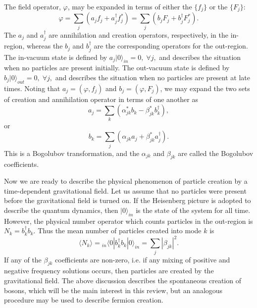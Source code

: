 \documentclass[12pt,onecolumn,eqsecnum,floats,aps,prd,floatfix,titlepage,tightenlines]{revtex4-2}
\begin{document}
The field operator, $\varphi$, may be expanded in terms of either the
$\{ f_j \}$ or the $\{ F_j \}$:
\begin{equation}
  \varphi = \sum\limits_j (a_j f_j + a_j^\dagger f_j^*)
  =\sum\limits_j (b_j F_j + b_j^\dagger F_j^*).
\end{equation}
The $a_j$ and $a_j^\dagger$ are annihilation and creation operators,
respectively, in the in-region, whereas the $b_j$ and $b_j^\dagger$
are the corresponding operators for the out-region. The in-vacuum state
is defined by $a_j|0\rangle_{in}=0, \; \forall j,$ and describes the
situation when no particles are present initially. The out-vacuum state
is defined by $b_j|0\rangle_{out}=0, \; \forall j,$ and describes the
situation when no particles are present at late times. Noting that
$a_j = (\varphi,f_j)$ and $b_j = (\varphi,F_j)$, we may expand the
two sets of creation and annihilation operator in terms of one another
as 
\begin{equation}
a_j=\sum\limits_k (\alpha _{jk}^*b_k-\beta _{jk}^* b_k^\dagger),
                                      \label{eq:Bogo1}
\end{equation}
or 
\begin{equation}
b_k=\sum\limits_j (\alpha _{jk} a_j + \beta _{jk}^* a _j^\dagger).
                                       \label{eq:Bogo2}
\end{equation}
This is a Bogolubov transformation, and the $\alpha_{jk}$ and
$\beta_{jk}$ are called the Bogolubov coefficients.

   Now we are ready to describe the physical phenomenon of particle
creation by a time-dependent gravitational field. Let us assume that
no particles were present before the gravitational field is turned on.
If the Heisenberg picture is adopted to describe the quantum dynamics,
then $|0\rangle_{in}$ is the state of the system for all time. However,
the physical number operator which counts particles in the out-region
is $N_k = b_k^\dagger b_k$. Thus the mean number of particles created
into mode $k$ is 
\begin{equation}
\langle N_k \rangle = {}_{in}\langle 0|b_k^\dagger b_k |0\rangle_{in}
       = \sum\limits_j |{\beta _{jk}}|^2.
 \label{eq:N}      
\end{equation}
If any of the $\beta_{jk}$ coefficients are non-zero, i.e. if
any mixing of positive and negative frequency solutions occurs, then
particles are created by the gravitational field.  The above discussion describes the 
spontaneous creation of bosons, which will be the main interest in this review,
but an analogous procedure may be used to describe fermion creation.
 
\end{document}
